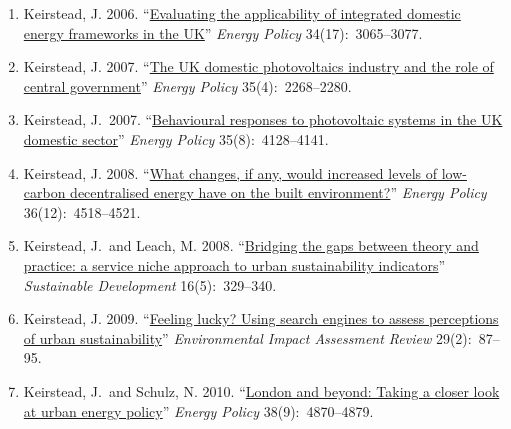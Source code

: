 \documentclass[11pt,a4paper]{article}
\newcommand{\marginhead}[1]{\marginpar{\textsf{{\footnotesize #1}}}}
\newcommand{\flag}{\marginpar{\hfill\raisebox{-2pt}{*}}}
\begin{document}
\bigskip 

\noindent\marginhead{Journal articles}%
%
%  
\mbox{}\vspace{-2em}
\begin{enumerate}

\item Keirstead, J. 2006. ``\href{http://dx.doi.org/10.1016/j.enpol.2005.06.004}{Evaluating the applicability of integrated domestic energy frameworks in the UK}'' \emph{Energy Policy} 34(17):~3065--3077.

\item Keirstead, J. 2007. ``\href{http://dx.doi.org/10.1016/j.enpol.2006.08.003}{The UK domestic photovoltaics industry and the role of central government}'' \emph{Energy Policy} 35(4):~2268--2280.

\item Keirstead, J.\flag\ 2007. ``\href{http://dx.doi.org/10.1016/j.enpol.2007.02.019}{Behavioural responses to photovoltaic systems in the UK domestic sector}'' \emph{Energy Policy} 35(8):~4128--4141.

\item Keirstead, J. 2008. ``\href{http://dx.doi.org/10.1016/j.enpol.2008.09.019}{What changes, if any, would increased levels of low-carbon decentralised energy have on the built environment?}'' \emph{Energy Policy} 36(12):~4518--4521.

\item Keirstead, J.\  and Leach, M.  2008. ``\href{http://dx.doi.org/10.1002/sd.349}{Bridging the gaps between theory and practice: a service niche approach to urban sustainability indicators}'' \emph{Sustainable Development} 16(5):~329--340.

\item Keirstead, J. 2009. ``\href{http://dx.doi.org/10.1016/j.eiar.2008.09.001}{Feeling lucky? Using search engines to assess perceptions of urban sustainability}'' \emph{Environmental Impact Assessment Review} 29(2):~87--95.

\item Keirstead, J.\  and Schulz, N. 2010. ``\href{http://dx.doi.org/10.1016/j.enpol.2009.07.025}{London and beyond: Taking a closer look at urban energy policy}'' \emph{Energy Policy} 38(9):~4870--4879.


\end{enumerate}
\end{document}
